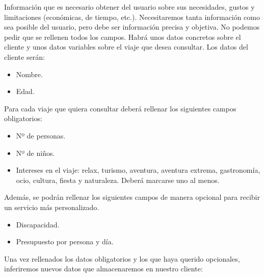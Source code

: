 \documentclass[11pt, a4paper, spanish, openright, twoside]{book}
\begin{document}
	\newpage
	\begin{section}{Información que es necesario obtener del usuario sobre sus necesidades, gustos y limitaciones (económicas, de tiempo, etc.).}
		Necesitaremos tanta información como sea posible del usuario, pero debe ser información precisa y objetiva. No podemos pedir que se 
		rellenen todos los campos. Habrá unos datos concretos sobre el cliente y unos datos variables sobre el viaje que desea consultar.
		Los datos del cliente serán:
		
				\begin{itemize}
					\item Nombre.
					\item Edad.									
				\end{itemize}
		
		Para cada viaje que quiera consultar deberá rellenar los siguientes campos obligatorios:
		
					\begin{itemize}
					\item Nº de personas.
					\item Nº de niños.
					\item Intereses en el viaje: relax, turismo, aventura, aventura extrema, gastronomía, ocio, cultura, fiesta y naturaleza. Deberá marcarse uno al menos.	
					
				\end{itemize}
		Además, se podrán rellenar los siguientes campos de manera opcional para recibir un servicio más personalizado.
		
				\begin{itemize}
					\item Discapacidad.
					\item Presupuesto por persona y día.	
				
				\end{itemize}
		Una vez rellenados los datos obligatorios y los que haya querido opcionales, inferiremos nuevos datos que almacenaremos en nuestro cliente:
		

\end{section}
\end{document}
